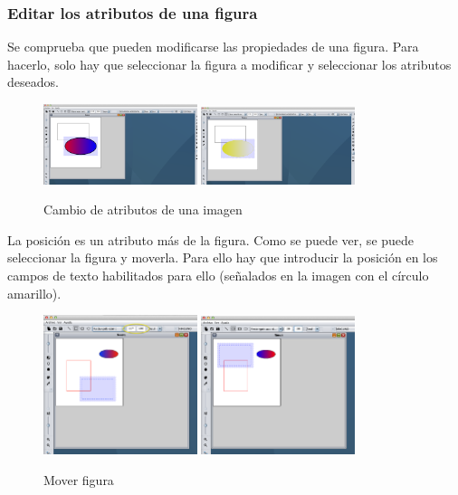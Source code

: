  \subsubsection{Editar los atributos de una figura}
 Se comprueba que pueden modificarse las propiedades de una figura. Para hacerlo, solo hay que seleccionar la figura a modificar y seleccionar los atributos deseados.
 \vskip0.3cm
\begin{figure}[H]
 \centering
  \includegraphics[width=0.4\textwidth]{graficos/cambioAtributos1.png}
  \includegraphics[width=0.4\textwidth]{graficos/cambioAtributos2.png}
 \caption{Cambio de atributos de una imagen}
 \label{diseño}
 \end{figure}
\vskip0.3cm
La posición es un atributo más de la figura. Como se puede ver, se puede seleccionar la figura y moverla. Para ello hay que introducir la posición en los campos de texto habilitados para ello (señalados en la imagen con el círculo amarillo).
 \vskip0.3cm
\begin{figure}[H]
 \centering
  \includegraphics[width=0.4\textwidth]{graficos/mover1.png}
  \includegraphics[width=0.4\textwidth]{graficos/mover2.jpg}
 \caption{Mover figura}
 \label{diseño}
 \end{figure}
